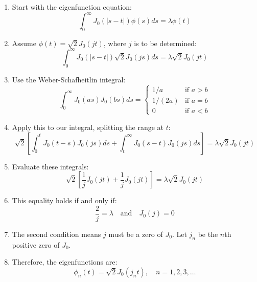 \documentclass{article}
\begin{document}
\begin{enumerate}
    \item Start with the eigenfunction equation:
    \begin{equation}
        \int_0^\infty J_0(|s-t|) \phi(s) ds = \lambda \phi(t)
    \end{equation}

    \item Assume $\phi(t) = \sqrt{2} J_0(jt)$, where $j$ is to be determined:
    \begin{equation}
        \int_0^\infty J_0(|s-t|) \sqrt{2} J_0(js) ds = \lambda \sqrt{2} J_0(jt)
    \end{equation}

    \item Use the Weber-Schafheitlin integral:
    \begin{equation}
        \int_0^\infty J_0(as) J_0(bs) ds = 
        \begin{cases}
            1/a & \text{if } a > b \\
            1/(2a) & \text{if } a = b \\
            0 & \text{if } a < b
        \end{cases}
    \end{equation}

    \item Apply this to our integral, splitting the range at $t$:
    \begin{equation}
        \sqrt{2} \left[\int_0^t J_0(t-s) J_0(js) ds + \int_t^\infty J_0(s-t) J_0(js) ds\right] = \lambda \sqrt{2} J_0(jt)
    \end{equation}

    \item Evaluate these integrals:
    \begin{equation}
        \sqrt{2} \left[\frac{1}{j} J_0(jt) + \frac{1}{j} J_0(jt)\right] = \lambda \sqrt{2} J_0(jt)
    \end{equation}

    \item This equality holds if and only if:
    \begin{equation}
        \frac{2}{j} = \lambda \quad \text{and} \quad J_0(j) = 0
    \end{equation}

    \item The second condition means $j$ must be a zero of $J_0$. Let $j_n$ be the $n$th positive zero of $J_0$.

    \item Therefore, the eigenfunctions are:
    \begin{equation}
        \phi_n(t) = \sqrt{2} J_0(j_n t), \quad n = 1, 2, 3, \ldots
    \end{equation}


\end{enumerate}
\end{document}
